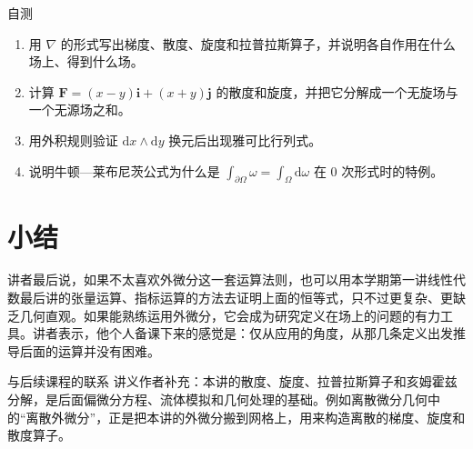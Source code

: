 \documentclass[a4paper]{article}
\begin{document}
\begin{practicebox}{自测}
\begin{enumerate}
\item 用 $\nabla$ 的形式写出梯度、散度、旋度和拉普拉斯算子，并说明各自作用在什么场上、得到什么场。
\item 计算 $\boldsymbol F=(x-y)\boldsymbol i+(x+y)\boldsymbol j$ 的散度和旋度，并把它分解成一个无旋场与一个无源场之和。
\item 用外积规则验证 $\mathrm{d}x\wedge\mathrm{d}y$ 换元后出现雅可比行列式。
\item 说明牛顿—莱布尼茨公式为什么是 $\int_{\partial\Omega}\omega=\int_\Omega\mathrm{d}\omega$ 在 0 次形式时的特例。
\end{enumerate}
\end{practicebox}

\section{小结}

讲者最后说，如果不太喜欢外微分这一套运算法则，也可以用本学期第一讲线性代数最后讲的张量运算、指标运算的方法去证明上面的恒等式，只不过更复杂、更缺乏几何直观。如果能熟练运用外微分，它会成为研究定义在场上的问题的有力工具。讲者表示，他个人备课下来的感觉是：仅从应用的角度，从那几条定义出发推导后面的运算并没有困难。

\begin{knowledgebox}{与后续课程的联系}
讲义作者补充：本讲的散度、旋度、拉普拉斯算子和亥姆霍兹分解，是后面偏微分方程、流体模拟和几何处理的基础。例如离散微分几何中的“离散外微分”，正是把本讲的外微分搬到网格上，用来构造离散的梯度、旋度和散度算子。
\end{knowledgebox}
\end{document}
